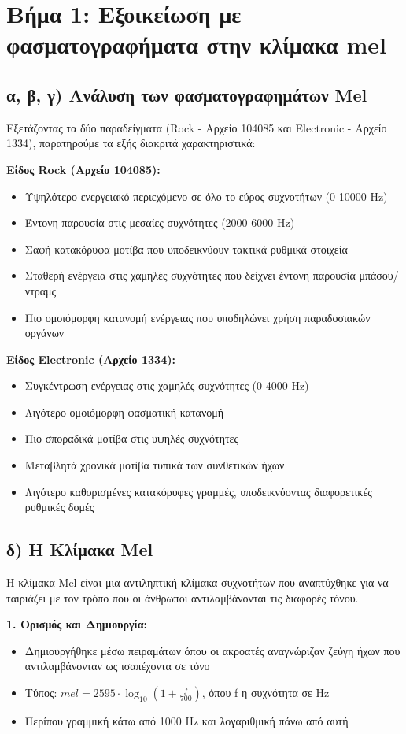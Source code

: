 \documentclass[a4paper,12pt]{article}
\begin{document}
\section*{Βήμα 1: Εξοικείωση με φασματογραφήματα στην κλίμακα mel}

\subsection*{α, β, γ) Ανάλυση των φασματογραφημάτων Mel}
Εξετάζοντας τα δύο παραδείγματα (Rock - Αρχείο 104085 και Electronic - Αρχείο 1334), παρατηρούμε τα εξής διακριτά χαρακτηριστικά:

\textbf{Είδος Rock (Αρχείο 104085):}
\begin{itemize}
    \item Υψηλότερο ενεργειακό περιεχόμενο σε όλο το εύρος συχνοτήτων (0-10000 Hz)
    \item Έντονη παρουσία στις μεσαίες συχνότητες (2000-6000 Hz)
    \item Σαφή κατακόρυφα μοτίβα που υποδεικνύουν τακτικά ρυθμικά στοιχεία
    \item Σταθερή ενέργεια στις χαμηλές συχνότητες που δείχνει έντονη παρουσία μπάσου/ντραμς
    \item Πιο ομοιόμορφη κατανομή ενέργειας που υποδηλώνει χρήση παραδοσιακών οργάνων
\end{itemize}

\textbf{Είδος Electronic (Αρχείο 1334):}
\begin{itemize}
    \item Συγκέντρωση ενέργειας στις χαμηλές συχνότητες (0-4000 Hz)
    \item Λιγότερο ομοιόμορφη φασματική κατανομή
    \item Πιο σποραδικά μοτίβα στις υψηλές συχνότητες
    \item Μεταβλητά χρονικά μοτίβα τυπικά των συνθετικών ήχων
    \item Λιγότερο καθορισμένες κατακόρυφες γραμμές, υποδεικνύοντας διαφορετικές ρυθμικές δομές
\end{itemize}

\subsection*{δ) Η Κλίμακα Mel}
Η κλίμακα Mel είναι μια αντιληπτική κλίμακα συχνοτήτων που αναπτύχθηκε για να ταιριάζει με τον τρόπο που οι άνθρωποι αντιλαμβάνονται τις διαφορές τόνου.

\textbf{1. Ορισμός και Δημιουργία:}
\begin{itemize}
    \item Δημιουργήθηκε μέσω πειραμάτων όπου οι ακροατές αναγνώριζαν ζεύγη ήχων που αντιλαμβάνονταν ως ισαπέχοντα σε τόνο
    \item Τύπος: $mel = 2595 \cdot \log_{10}(1 + \frac{f}{700})$, όπου f η συχνότητα σε Hz
    \item Περίπου γραμμική κάτω από 1000 Hz και λογαριθμική πάνω από αυτή
\end{itemize}
\end{document}

